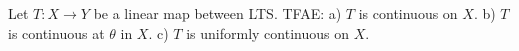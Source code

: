 Let $T: X \to Y$ be a linear map between LTS. TFAE: a) $T$ is continuous on $X$. b) $T$ is continuous at $\theta$ in $X$. c) $T$ is uniformly continuous on $X$.